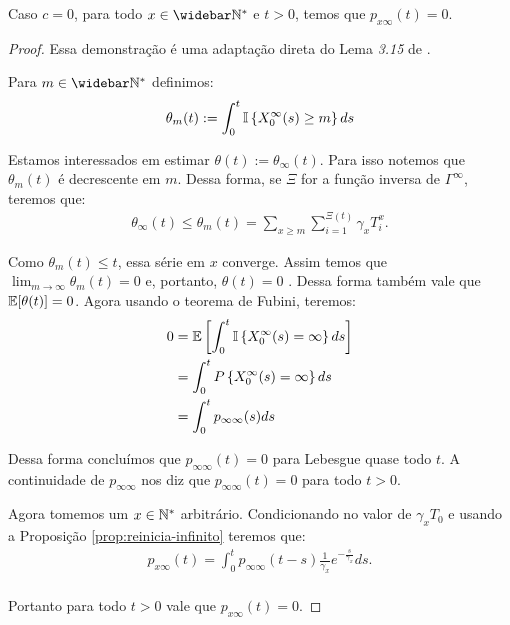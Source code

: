 \begin{proposicao}
  \label{prop:naocontinuidade}
  Caso $c = 0$, para todo $x \in \Nzb$ e $t > 0$, temos que $p_{x
    \infty} (t) = 0$.
\end{proposicao}
\begin{proof}
  Essa demonstração é uma adaptação direta do Lema \emph{3.15} de
  \cite{fontes:08}.

  Para $m \in \Nzb$  definimos:
  \begin{align*}
    \theta_m(t) := \int_0^t {\mathbb{I}} \left\{ X^\infty_0(s) \geq m \right\} ds
  \end{align*}

  Estamos interessados em estimar $\theta(t) :=
  \theta_\infty(t)$. Para isso notemos que $\theta_m(t)$ é decrescente em
  $m$. Dessa forma, se $\Xi$ for a função inversa de $\Gamma^\infty$, teremos
  que:
  \begin{align*}
    \theta_\infty(t) \leq \theta_m(t) = \sum_{x \geq m}
    \sum_{i=1}^{\Xi(t)} \gamma_x T^x_i.
  \end{align*}


  Como $\theta_m(t) \leq t$, essa série em $x$ converge. Assim temos
  que $\lim_{m\to\infty} \theta_m(t) = 0$ \qc e, portanto, $\theta(t) =
  0$ \qc. Dessa forma também vale que ${\mathbb{E}}[\theta(t)] = 0$. Agora
  usando o teorema de Fubini, teremos:
  \begin{align*}
    0 &= {\mathbb{E}}\left[ \int_0^t {\mathbb{I}} \left\{ X^\infty_0(s) = \infty
      \right\} ds \right]\\
    &= \int_0^t P \left\{ X^\infty_0(s) = \infty
    \right\} ds\\
    &= \int_0^t p_{\infty \infty} (s) ds
  \end{align*}

  Dessa forma concluímos que $p_{\infty \infty} (t) = 0$ para Lebesgue
  quase todo $t$. A continuidade de $p_{\infty \infty}$ nos diz que
  $p_{\infty \infty}(t) = 0$ para todo $t > 0$.

  Agora tomemos um $x \in {\mathbb{N^*}}$ arbitrário. Condicionando no valor de
  $\gamma_x T_0$ e usando a Proposição \ref{prop:reinicia-infinito}
  teremos que:
  \begin{align*}
    p_{x \infty} (t) = \int_0^t p_{\infty \infty} (t-s)
    \frac{1}{\gamma_x}e^{-\frac{s}{\gamma_x}} ds.\\
  \end{align*}

  Portanto para todo $t > 0$ vale que $p_{x \infty} (t) = 0$.
\end{proof}


